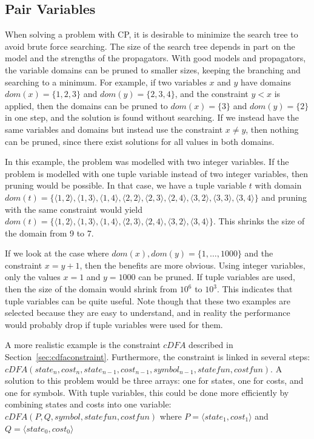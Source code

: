 \documentclass[a4paper,11pt]{article}
\begin{document}
\subsection{Pair Variables}
When solving a problem with CP, it is desirable to minimize the search tree to avoid brute force searching. The size of the search tree depends in part on the model and the strengths of the propagators. With good models and propagators, the variable domains can be pruned to smaller sizes, keeping the branching and searching to a minimum. For example, if two variables $x$ and $y$ have domains $dom(x)=\{1,2,3\}$ and $dom(y)=\{2,3,4\}$, and the constraint $y<x$ is applied, then the domains can be pruned to $dom(x)=\{3\}$ and $dom(y)=\{2\}$ in one step, and the solution is found without searching. If we instead have the same variables and domains but instead use the constraint $x\neq y$, then nothing can be pruned, since there exist solutions for all values in both domains.

In this example, the problem was modelled with two integer variables. If the problem is modelled with one tuple variable instead of two integer variables, then pruning would be possible. In that case, we have a tuple variable $t$ with domain 
$dom(t)=\{
\langle1,2\rangle,\allowbreak 
\langle1,3\rangle,\allowbreak 
\langle1,4\rangle,\allowbreak
\langle2,2\rangle,\allowbreak
\langle2,3\rangle,\allowbreak
\langle2,4\rangle,\allowbreak
\langle3,2\rangle,\allowbreak
\langle3,3\rangle,\allowbreak
\langle3,4\rangle\}$ 
and pruning with the same constraint would yield 
$dom(t)=\{
\langle1,2\rangle,\allowbreak
\langle1,3\rangle,\allowbreak
\langle1,4\rangle,\allowbreak
\langle2,3\rangle,\allowbreak
\langle2,4\rangle,\allowbreak
\langle3,2\rangle,\allowbreak
\langle3,4\rangle\}$. 
This shrinks the size of the domain from 9 to 7. 

If we look at the case where $dom(x),dom(y)=\{1,\ldots,1000\}$ and the constraint $x=y+1$, then the benefits are more obvious. Using integer variables, only the values $x=1$ and $y=1000$ can be pruned. If tuple variables are used, then the size of the domain would shrink from $10^6$ to $10^3$. This indicates that tuple variables can be quite useful. Note though that these two examples are selected because they are easy to understand, and in reality the performance would probably drop if tuple variables were used for them. 

A more realistic example is the constraint $cDFA$ described in Section~\ref{sec:cdfaconstraint}. Furthermore, the constraint is linked in several steps: 
$cDFA(state_n, \allowbreak
cost_n,\allowbreak
state_{n-1},\allowbreak
cost_{n-1},\allowbreak
symbol_{n-1},\allowbreak
statefun, \allowbreak
costfun)$. A solution to this problem would be three arrays: one for states, one for costs, and one for symbols. With tuple variables, this could be done more efficiently by combining states and costs into one variable: 
$cDFA(P, \allowbreak
Q, \allowbreak
symbol, \allowbreak
statefun, \allowbreak
costfun)$ where $P=\langle state_1, cost_1\rangle$ and $Q=\langle state_0, cost_0\rangle$
\end{document}
